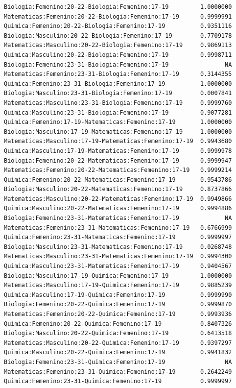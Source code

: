 \documentclass{rapport}
\begin{document}
\begin{itemize}
\begin{verbatim}
Biologia:Femenino:20-22-Biologia:Femenino:17-19         1.0000000
Matematicas:Femenino:20-22-Biologia:Femenino:17-19      0.9999991
Quimica:Femenino:20-22-Biologia:Femenino:17-19          0.9351116
Biologia:Masculino:20-22-Biologia:Femenino:17-19        0.7709178
Matematicas:Masculino:20-22-Biologia:Femenino:17-19     0.9869113
Quimica:Masculino:20-22-Biologia:Femenino:17-19         0.9998711
Biologia:Femenino:23-31-Biologia:Femenino:17-19                NA
Matematicas:Femenino:23-31-Biologia:Femenino:17-19      0.3144355
Quimica:Femenino:23-31-Biologia:Femenino:17-19          1.0000000
Biologia:Masculino:23-31-Biologia:Femenino:17-19        0.0007841
Matematicas:Masculino:23-31-Biologia:Femenino:17-19     0.9999760
Quimica:Masculino:23-31-Biologia:Femenino:17-19         0.9077281
Quimica:Femenino:17-19-Matematicas:Femenino:17-19       1.0000000
Biologia:Masculino:17-19-Matematicas:Femenino:17-19     1.0000000
Matematicas:Masculino:17-19-Matematicas:Femenino:17-19  0.9943680
Quimica:Masculino:17-19-Matematicas:Femenino:17-19      0.9999978
Biologia:Femenino:20-22-Matematicas:Femenino:17-19      0.9999947
Matematicas:Femenino:20-22-Matematicas:Femenino:17-19   0.9999214
Quimica:Femenino:20-22-Matematicas:Femenino:17-19       0.9543786
Biologia:Masculino:20-22-Matematicas:Femenino:17-19     0.8737866
Matematicas:Masculino:20-22-Matematicas:Femenino:17-19  0.9949866
Quimica:Masculino:20-22-Matematicas:Femenino:17-19      0.9994886
Biologia:Femenino:23-31-Matematicas:Femenino:17-19             NA
Matematicas:Femenino:23-31-Matematicas:Femenino:17-19   0.6766999
Quimica:Femenino:23-31-Matematicas:Femenino:17-19       0.9999997
Biologia:Masculino:23-31-Matematicas:Femenino:17-19     0.0268748
Matematicas:Masculino:23-31-Matematicas:Femenino:17-19  0.9994300
Quimica:Masculino:23-31-Matematicas:Femenino:17-19      0.9404567
Biologia:Masculino:17-19-Quimica:Femenino:17-19         1.0000000
Matematicas:Masculino:17-19-Quimica:Femenino:17-19      0.9885239
Quimica:Masculino:17-19-Quimica:Femenino:17-19          0.9999990
Biologia:Femenino:20-22-Quimica:Femenino:17-19          0.9999870
Matematicas:Femenino:20-22-Quimica:Femenino:17-19       0.9993936
Quimica:Femenino:20-22-Quimica:Femenino:17-19           0.8407326
Biologia:Masculino:20-22-Quimica:Femenino:17-19         0.6413518
Matematicas:Masculino:20-22-Quimica:Femenino:17-19      0.9397297
Quimica:Masculino:20-22-Quimica:Femenino:17-19          0.9941832
Biologia:Femenino:23-31-Quimica:Femenino:17-19                 NA
Matematicas:Femenino:23-31-Quimica:Femenino:17-19       0.2642249
Quimica:Femenino:23-31-Quimica:Femenino:17-19           0.9999997

\end{verbatim}
\end{itemize}
\end{document}
